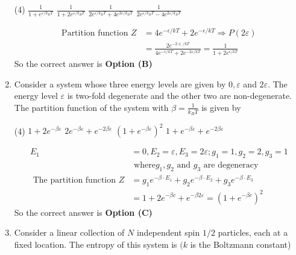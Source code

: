 \begin{enumerate}
	\begin{tasks}(4)
		\task[\textbf{A.}] $\frac{1}{1+e^{\varepsilon / k_{B} T}}$
		\task[\textbf{B.}] $\frac{1}{1+2 e^{\varepsilon / k_{B} T}}$
		\task[\textbf{C.}] $\frac{1}{2 e^{\varepsilon / k_{B} T}+4 e^{2 \varepsilon / k_{B} T}}$
		\task[\textbf{D.}] $\frac{1}{2 e^{\varepsilon / k_{B} T}-4 e^{2 \varepsilon / k_{B} T}}$
	\end{tasks}
	\begin{answer}
		\begin{align*}
		\text{Partition function }Z&=4 e^{-\epsilon / k T}+2 e^{-\epsilon / k T} \Rightarrow P(2 \varepsilon)\\&=\frac{2 e^{-2 \in / k T}}{4 e^{-\epsilon / k T}+2 e^{-2 \varepsilon / k T}}=\frac{1}{1+2 e^{\epsilon / k T}}
		\end{align*}
		So the correct answer is \textbf{Option (B)}
	\end{answer}	
	\item Consider a system whose three energy levels are given by $0, \varepsilon$ and $2 \varepsilon$. The energy level $\varepsilon$ is two-fold degenerate and the other two are non-degenerate. The partition function of the system with $\beta=\frac{1}{k_{B} T}$ is given by
	{}
	\begin{tasks}(4)
		\task[\textbf{A.}] $1+2 e^{-\beta \varepsilon}$
		\task[\textbf{B.}] $2 e^{-\beta \varepsilon}+e^{-2 \beta \varepsilon}$
		\task[\textbf{C.}] $\left(1+e^{-\beta \varepsilon}\right)^{2}$
		\task[\textbf{D.}] $1+e^{-\beta \varepsilon}+e^{-2 \beta \varepsilon}$
	\end{tasks}
	\begin{answer}
		\begin{align*}
		E_{1}&=0, E_{2}=\varepsilon, E_{3}=2 \varepsilon ; g_{1}=1, g_{2}=2, g_{3}=1\\&\text{ where} g_{1}, g_{2}\text{ and }g_{3}\text{ are degeneracy}\\
		\text{	The partition function }Z&=g_{1} e^{-\beta \cdot E_{1}}+g_{2} e^{-\beta \cdot E_{2}}+g_{3} e^{-\beta \cdot E_{3}}\\&=1+2 e^{-\beta c}+e^{-\beta 2 \varepsilon}=\left(1+e^{-\beta c}\right)^{2}
		\end{align*}
		So the correct answer is \textbf{Option (C)}
	\end{answer}	
	\item Consider a linear collection of $N$ independent spin $1 / 2$ particles, each at a fixed location. The entropy of this system is $(k$ is the Boltzmann constant)
	{}

\end{enumerate}
